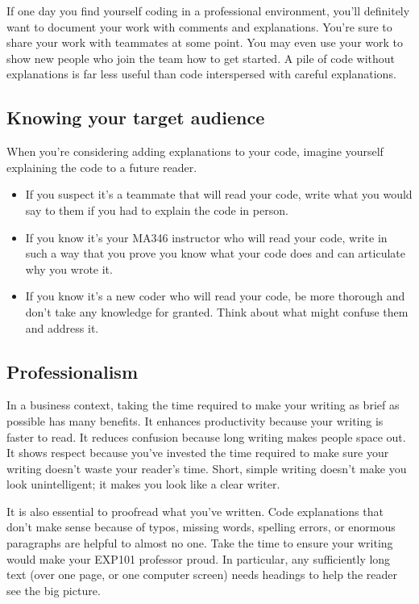 \documentclass[letterpaper,10pt,english]{sphinxmanual}
\begin{document}
If one day you find yourself coding in a professional environment, you’ll definitely want to document your work with comments and explanations.  You’re sure to share your work with teammates at some point.  You may even use your work to show new people who join the team how to get started.  A pile of code without explanations is far less useful than code interspersed with careful explanations.


\subsection{Knowing your target audience}
\label{\detokenize{chapter-5-before-and-after:knowing-your-target-audience}}
When you’re considering adding explanations to your code, imagine yourself explaining the code to a future reader.
\begin{itemize}
\item {} 
If you suspect it’s a teammate that will read your code, write what you would say to them if you had to explain the code in person.

\item {} 
If you know it’s your MA346 instructor who will read your code, write in such a way that you prove you know what your code does and can articulate why you wrote it.

\item {} 
If you know it’s a new coder who will read your code, be more thorough and don’t take any knowledge for granted.  Think about what might confuse them and address it.

\end{itemize}


\subsection{Professionalism}
\label{\detokenize{chapter-5-before-and-after:professionalism}}
In a business context, taking the time required to make your writing as brief as possible has many benefits.  It enhances productivity because your writing is faster to read.  It reduces confusion because long writing makes people space out.  It shows respect because you’ve invested the time required to make sure your writing doesn’t waste your reader’s time.  Short, simple writing doesn’t make you look unintelligent; it makes you look like a clear writer.

It is also essential to proofread what you’ve written.  Code explanations that don’t make sense because of typos, missing words, spelling errors, or enormous paragraphs are helpful to almost no one.  Take the time to ensure your writing would make your EXP101 professor proud.  In particular, any sufficiently long text (over one page, or one computer screen) needs headings to help the reader see the big picture.
\end{document}
